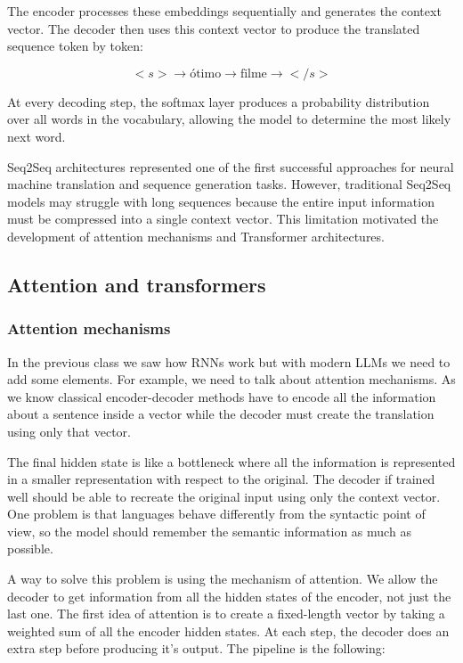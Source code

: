 The encoder processes these embeddings sequentially and generates the context vector.
The decoder then uses this context vector to produce the translated sequence token by
token:

\[
<s> \rightarrow \text{ótimo} \rightarrow \text{filme} \rightarrow </s>
\]

At every decoding step, the softmax layer produces a probability distribution over
all words in the vocabulary, allowing the model to determine the most likely next
word.

Seq2Seq architectures represented one of the first successful approaches for neural
machine translation and sequence generation tasks. However, traditional Seq2Seq
models may struggle with long sequences because the entire input information must be
compressed into a single context vector. This limitation motivated the development of
attention mechanisms and Transformer architectures.

\subsection{Attention and transformers}


\subsubsection{Attention mechanisms}

In the previous class we saw how RNNs work but with modern LLMs we need to add some elements. For example, we need to talk about attention mechanisms. As we know classical encoder-decoder methods have to encode all the information about a sentence inside a vector while the decoder must create the translation using only that vector. 

\vspace{10pt}

The final hidden state is like a bottleneck where all the information is represented in a smaller representation with respect to the original. The decoder if trained well should be able to recreate the original input using only the context vector. One problem is that languages behave differently from the syntactic point of view, so the model should remember the semantic information as much as possible. 

\vspace{10pt}

A way to solve this problem is using the mechanism of attention. We allow the decoder to get information from all the hidden states of the encoder, not just the last one. The first idea of attention is to create a fixed-length vector by taking a weighted sum of all the encoder hidden states. At each step, the decoder does an extra step before producing it's output. The pipeline is the following:

